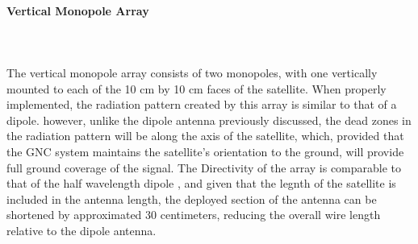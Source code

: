 \paragraph{Vertical Monopole Array}~\\ ~\\
The vertical monopole array consists of two monopoles, with one vertically mounted to each of the 10 cm by 10 cm faces of the satellite. When properly implemented, the radiation pattern created by this array is similar to that of a dipole. however, unlike the dipole antenna previously discussed, the dead zones in the radiation pattern will be along the axis of the satellite, which, provided that the GNC system maintains the satellite's orientation to the ground, will provide full ground coverage of the signal. The Directivity of the array is comparable to that of the half wavelength dipole \cite{Dipole}, and given that the legnth of the satellite is included in the antenna length, the deployed section of the antenna can be shortened by approximated 30 centimeters, reducing the overall wire length relative to the dipole antenna.

